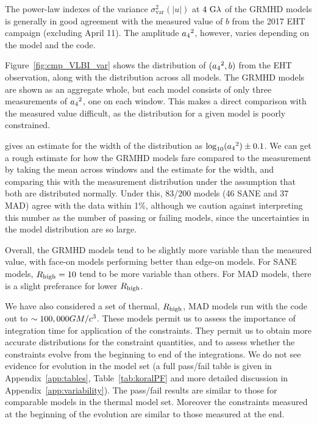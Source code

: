 
The power-law indexes of the variance $\sigma_\text{var}^2 (|u|)$ at $4~{\rm G}\lambda$ of the GRMHD models is generally in good agreement with the measured value of $b$ from the 2017 EHT campaign (excluding April 11). The amplitude ${a_4}^2$, however, varies depending on the model and the code.

Figure~\ref{fig:cmp_VLBI_var} shows the distribution of $({a_4}^2, b)$ from the EHT observation, along with the distribution across all \kharma models. The GRMHD models are shown as an aggregate whole, but each model consists of only three measurements of ${a_4}^2$, one on each window. This makes a direct comparison with the measured value difficult, as the distribution for a given model is poorly constrained.

\citet{Georgiev_2022} gives an estimate for the width of the distribution as $\log_{10}({a_4}^2) \pm 0.1$. We can get a rough estimate for how the GRMHD models fare compared to the measurement by taking the mean across windows and the estimate for the width, and comparing this with the measurement distribution under the assumption that both are distributed normally. Under this, 83/200 models (46 SANE and 37 MAD) agree with the data within 1\%, although we caution against interpreting this number as the number of passing or failing models, since the uncertainties in the model distribution are so large.

Overall, the GRMHD models tend to be slightly more variable than the measured value, with face-on models performing better than edge-on models. For SANE models, $R_\mathrm{high} = 10$ tend to be more variable than others. For MAD models, there is a slight preferance for lower $R_\mathrm{high}$.

We have also considered a set of thermal, $R_\mathrm{high}$, MAD models run with the \koral code out to $\sim 100,000GM/c^3$.  These models permit us to assess the importance of integration time for application of the constraints.  They permit us to obtain more accurate distributions for the constraint quantities, and to assess whether the constraints evolve from the beginning to end of the integrations. We do not see evidence for evolution in the \koral model set (a full pass/fail table is given in Appendix~\ref{app:tables}, Table~\ref{tab:koralPF} and more detailed discussion in Appendix~\ref{app:variability}). The \koral pass/fail results are similar to those for comparable models in the \kharma thermal model set. Moreover the constraints measured at the beginning of the evolution are similar to those measured at the end.

